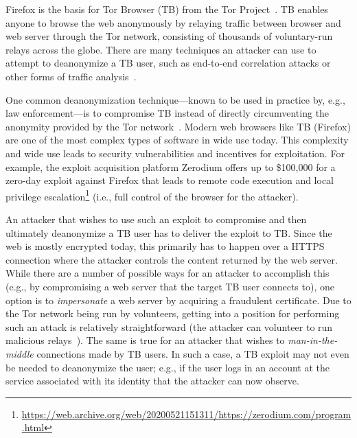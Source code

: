 Firefox is the basis for Tor Browser (TB) from the Tor Project~\cite{tor}. TB
enables anyone to browse the web anonymously by relaying traffic between browser
and web server through the Tor network, consisting of thousands of voluntary-run
relays across the globe. There are many techniques an attacker can use to
attempt to deanonymize a TB user, such as end-to-end correlation attacks or
other forms of traffic analysis~\cite{tor,FIXME}. 

One common deanonymization technique---known to be used in practice by, e.g., law
enforcement---is to compromise TB instead of directly circumventing the anonymity
provided by the Tor network~\cite{FIXME}. Modern web browsers like TB (Firefox)
are one of the most complex types of software in wide use today. This complexity
and wide use leads to security vulnerabilities and incentives for exploitation.
For example, the exploit acquisition platform Zerodium offers up to \$100,000
for a zero-day exploit against Firefox that leads to remote code execution and
local privilege
escalation\footnote{\url{https://web.archive.org/web/20200521151311/https://zerodium.com/program.html}}
(i.e., full control of the browser for the attacker).

An attacker that wishes to use such an exploit to compromise and then ultimately
deanonymize a TB user has to deliver the exploit to TB. Since the web is mostly
encrypted today, this primarily has to happen over a HTTPS connection where the
attacker controls the content returned by the web server. While there are a
number of possible ways for an attacker to accomplish this (e.g., by
compromising a web server that the target TB user connects to), one option is to
\emph{impersonate} a web server by acquiring a fraudulent certificate. Due to the
Tor network being run by volunteers, getting into a position for performing such
an attack is relatively straightforward (the attacker can volunteer to run
malicious relays~\cite{spoiled-onions}). The same is true for an attacker that
wishes to \emph{man-in-the-middle} connections made by TB users. In such a case,
a TB exploit may not even be needed to deanonymize the user; e.g., if the user
logs in an account at the service associated with its identity that the attacker
can now observe.

